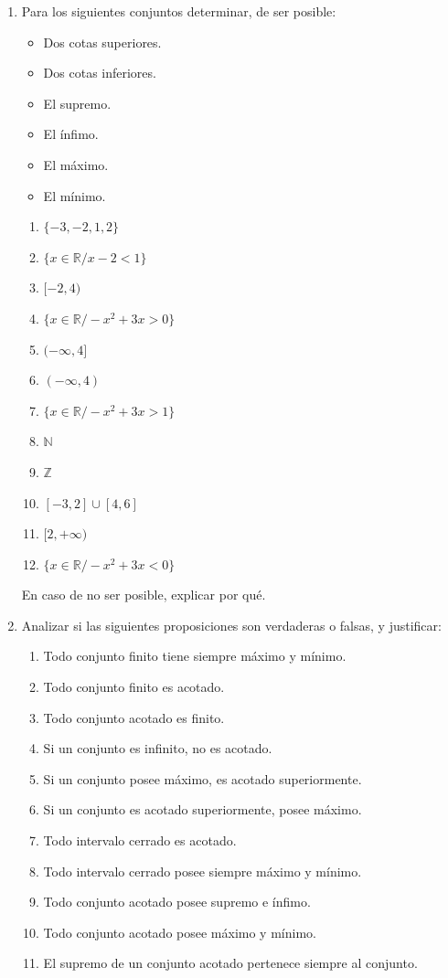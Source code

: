 \documentclass[12pt]{article}
\theoremstyle{definition}
\begin{document}
\begin{enumerate}
\item Para los siguientes conjuntos determinar, de ser posible:
\begin{multicols}{3}
\begin{itemize}
\setlength\itemsep{0em}
\item Dos cotas superiores.	
\item Dos cotas inferiores.		
\item El supremo.	
\item El ínfimo.
\item El máximo.
\item El mínimo.
\end{itemize}
\end{multicols}
\begin{multicols}{2}
\begin{enumerate}
\setlength\itemsep{0em}
\item $\{-3, -2, 1, 2\}$
\item $\{x \in \mathbb{R} / x-2 < 1\}$
\item $[-2,4)$
\item $\{x \in \mathbb{R} / -x^2+ 3x > 0\}$
\item $(-\infty, 4]$
\item $(-\infty, 4)$
\item $\{x \in \mathbb{R} / -x^2+ 3x > 1\}$
\item $\mathbb{N}$ 
\item $\mathbb{Z}$
\item $[-3,2] \cup [4, 6]$
\item $[2, +\infty)$
\item $\{x \in \mathbb{R} / -x^2+ 3x < 0\}$
\end{enumerate}
\end{multicols}
En caso de no ser posible, explicar por qué.
\vspace{1cm}

\item Analizar si las siguientes proposiciones son verdaderas o falsas, y justificar:
\begin{enumerate}
\setlength\itemsep{0em}
\item Todo conjunto finito tiene siempre máximo y mínimo.
\item Todo conjunto finito es acotado. 
\item Todo conjunto acotado es finito.
\item Si un conjunto es infinito, no es acotado. 
\item Si un conjunto posee máximo, es acotado superiormente.
\item Si un conjunto es acotado superiormente, posee máximo.
\item Todo intervalo cerrado es acotado.
\item Todo intervalo cerrado posee siempre máximo y mínimo.
\item Todo conjunto acotado posee supremo e ínfimo.
\item Todo conjunto acotado posee máximo y mínimo.
\item El supremo de un conjunto acotado pertenece siempre al conjunto.
\end{enumerate}


\end{enumerate}
\end{document}
